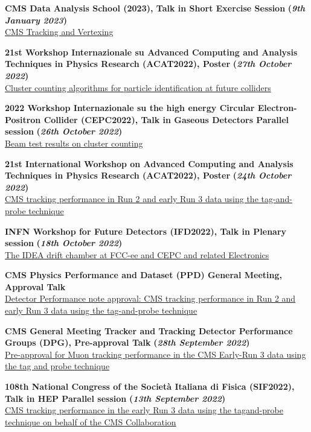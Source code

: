 \documentclass[11pt]{res}
\begin{document}
\begin{resume}
\textbf{CMS Data Analysis School (2023), Talk in Short Exercise Session} \textbf{(\textit{9th January 2023})}\\
\href{https://indico.cern.ch/event/1213827/timetable/}{CMS Tracking and Vertexing}

\textbf{21st Workshop Internazionale su Advanced Computing and Analysis Techniques in Physics Research (ACAT2022), Poster} \textbf{(\textit{27th October 2022})}\\
\href{https://indico.cern.ch/event/1106990/contributions/4998151/}{Cluster counting algorithms for particle identification at future colliders}

\textbf{2022 Workshop Internazionale su the high energy Circular Electron-Positron Collider (CEPC2022), Talk in Gaseous Detectors Parallel session} \textbf{(\textit{26th October 2022})}\\
\href{https://indico.ihep.ac.cn/event/17020/contributions/118085/}{Beam test results on cluster counting}

\textbf{21st International Workshop on Advanced Computing and Analysis Techniques in Physics Research (ACAT2022), Poster} \textbf{(\textit{24th October 2022})}\\
\href{https://indico.cern.ch/event/1106990/contributions/5096961/}{CMS tracking performance in Run 2 and early Run 3 data using the tag-and-probe technique}

\textbf{INFN Workshop for Future Detectors (IFD2022), Talk in Plenary session} \textbf{(\textit{18th October 2022})}\\
\href{https://agenda.infn.it/event/31581/contributions/177312/}{The IDEA drift chamber at FCC-ee and CEPC and related Electronics}

\textbf{CMS Physics Performance and Dataset (PPD) General Meeting, Approval Talk}\\
\href{https://indico.cern.ch/event/1210449/}{Detector Performance note approval: CMS tracking performance in Run 2 and early Run 3 data using the tag-and-probe technique}

\textbf{CMS General Meeting Tracker and Tracking Detector Performance Groups (DPG), Pre-approval Talk} \textbf{(\textit{28th September 2022})}\\
\href{https://indico.cern.ch/event/1190522/#9-pre-approval-for-offline-pri}{Pre-approval for Muon tracking performance in the CMS Early-Run 3 data using the tag and probe technique} 

\textbf{108th National Congress of the Società Italiana di Fisica (SIF2022), Talk in HEP Parallel session} \textbf{(\textit{13th September 2022})}\\ 
\href{https://2022.congresso.sif.it/talk/580}{CMS tracking performance in the early Run 3 data using the tagand-probe technique on behalf of the CMS Collaboration}


\end{resume}
\end{document}
